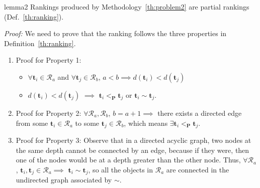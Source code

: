 \documentclass[acmsmall,screen, review]{acmart}
\begin{document}
\begin{mylem}{}{lemma2}
	Rankings produced by Methodology~\ref{th:problem2} are partial rankings (Def.~\ref{th:ranking}). 
\end{mylem}
\noindent \textit{Proof:} We need to prove that the ranking follows the three properties in Definition~\ref{th:ranking}.
\begin{enumerate}
	\item Proof for Property 1:
	\begin{itemize}
		\item  $\forall \mathbf{t}_i \in \mathcal{R}_a$ and  $\forall \mathbf{t}_j \in \mathcal{R}_b$, $a<b \implies  d(\mathbf{t}_i) < d(\mathbf{t}_j) $
		\item $d(\mathbf{t}_i) < d(\mathbf{t}_j) $ $\implies$ $\mathbf{t}_i <_{\mathbf{P}} \mathbf{t}_j$ or $\mathbf{t}_i \sim \mathbf{t}_j$.
	\end{itemize}
	
	\item Proof for Property 2: $\forall \mathcal{R}_a, \mathcal{R}_b$, $b=a+1 \implies$ there exists a directed edge from some $\mathbf{t}_i \in \mathcal{R}_a$ to some   $\mathbf{t}_j \in \mathcal{R}_b$, which means $\exists \mathbf{t}_i <_{\mathbf{P}} \mathbf{t}_j$.
	\item Proof for Property 3: Observe that in a directed acyclic graph, two nodes at the same depth cannot be connected by an edge, because if they were, then one of the nodes would be at a depth greater than the other node. Thus, $\forall \mathcal{R}_a$, $ \mathbf{t}_i, \mathbf{t}_j \in \mathcal{R}_a \implies $ $\mathbf{t}_i \sim \mathbf{t}_j$, so all the objects in $\mathcal{R}_a$ are connected in the undirected graph associated by $\sim$.
\end{enumerate}
\end{document}
